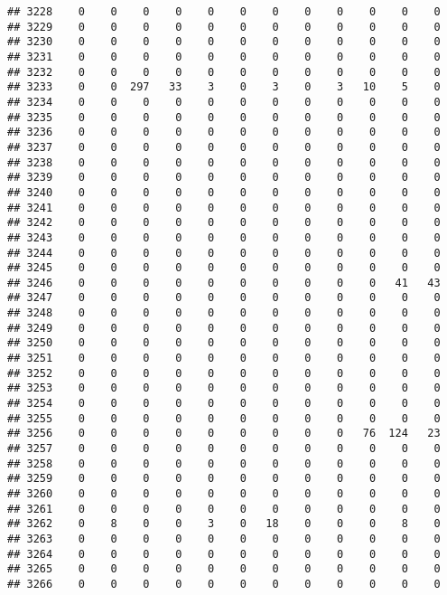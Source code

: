 \documentclass[]{article}
\begin{document}
\begin{verbatim}
## 3228    0    0    0    0    0    0    0    0    0    0    0    0
## 3229    0    0    0    0    0    0    0    0    0    0    0    0
## 3230    0    0    0    0    0    0    0    0    0    0    0    0
## 3231    0    0    0    0    0    0    0    0    0    0    0    0
## 3232    0    0    0    0    0    0    0    0    0    0    0    0
## 3233    0    0  297   33    3    0    3    0    3   10    5    0
## 3234    0    0    0    0    0    0    0    0    0    0    0    0
## 3235    0    0    0    0    0    0    0    0    0    0    0    0
## 3236    0    0    0    0    0    0    0    0    0    0    0    0
## 3237    0    0    0    0    0    0    0    0    0    0    0    0
## 3238    0    0    0    0    0    0    0    0    0    0    0    0
## 3239    0    0    0    0    0    0    0    0    0    0    0    0
## 3240    0    0    0    0    0    0    0    0    0    0    0    0
## 3241    0    0    0    0    0    0    0    0    0    0    0    0
## 3242    0    0    0    0    0    0    0    0    0    0    0    0
## 3243    0    0    0    0    0    0    0    0    0    0    0    0
## 3244    0    0    0    0    0    0    0    0    0    0    0    0
## 3245    0    0    0    0    0    0    0    0    0    0    0    0
## 3246    0    0    0    0    0    0    0    0    0    0   41   43
## 3247    0    0    0    0    0    0    0    0    0    0    0    0
## 3248    0    0    0    0    0    0    0    0    0    0    0    0
## 3249    0    0    0    0    0    0    0    0    0    0    0    0
## 3250    0    0    0    0    0    0    0    0    0    0    0    0
## 3251    0    0    0    0    0    0    0    0    0    0    0    0
## 3252    0    0    0    0    0    0    0    0    0    0    0    0
## 3253    0    0    0    0    0    0    0    0    0    0    0    0
## 3254    0    0    0    0    0    0    0    0    0    0    0    0
## 3255    0    0    0    0    0    0    0    0    0    0    0    0
## 3256    0    0    0    0    0    0    0    0    0   76  124   23
## 3257    0    0    0    0    0    0    0    0    0    0    0    0
## 3258    0    0    0    0    0    0    0    0    0    0    0    0
## 3259    0    0    0    0    0    0    0    0    0    0    0    0
## 3260    0    0    0    0    0    0    0    0    0    0    0    0
## 3261    0    0    0    0    0    0    0    0    0    0    0    0
## 3262    0    8    0    0    3    0   18    0    0    0    8    0
## 3263    0    0    0    0    0    0    0    0    0    0    0    0
## 3264    0    0    0    0    0    0    0    0    0    0    0    0
## 3265    0    0    0    0    0    0    0    0    0    0    0    0
## 3266    0    0    0    0    0    0    0    0    0    0    0    0

\end{verbatim}
\end{document}
